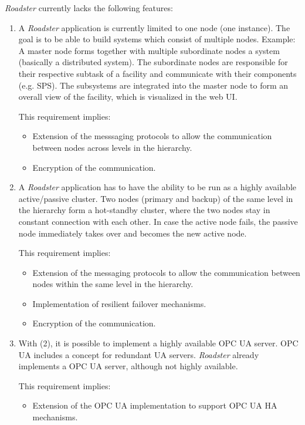 \documentclass[a4paper]{article}
\begin{document}
\emph{Roadster} currently lacks the following features:

\begin{enumerate}
	\item A \emph{Roadster} application is currently limited to one node
		(one instance). The goal is to be able to build systems which
		consist of multiple nodes. Example: A master node forms
		together with multiple subordinate nodes a system (basically a
		distributed system). The subordinate nodes are responsible for
		their respective subtask of a facility and communicate with
		their components (e.g. SPS). The subsystems are integrated into
		the master node to form an overall view of the facility, which
		is visualized in the web UI.

This requirement implies:

\begin{itemize}
	\item Extension of the messsaging protocols to allow the communication
		between nodes across levels in the hierarchy.

	\item Encryption of the communication.
\end{itemize}

\item A \emph{Roadster} application has to have the ability to be run as a
	highly available active/passive cluster. Two nodes (primary and backup)
	of the same level in the hierarchy form a hot-standby cluster, where
	the two nodes stay in constant connection with each other. In case the
	active node fails, the passive node immediately takes over and becomes
	the new active node.

This requirement implies:

\begin{itemize}
	\item Extension of the messaging protocols to allow the communication
		between nodes within the same level in the hierarchy.

	\item Implementation of resilient failover mechanisms.

	\item Encryption of the communication.
\end{itemize}


\item With (2), it is possible to implement a highly available OPC UA server.
	OPC UA \cite{opc-ua} includes a concept for redundant UA servers.
	\emph{Roadster} already implements a OPC UA server, although not highly
	available.

This requirement implies:

\begin{itemize}
	\item Extension of the OPC UA implementation to support OPC UA HA
		mechanisms.
\end{itemize}
\end{enumerate}
\end{document}
